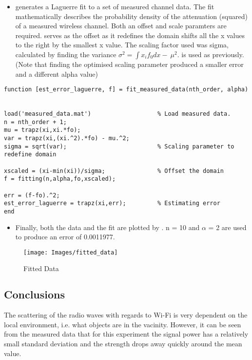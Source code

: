 \documentclass{article}
\begin{document}
 \begin{itemize}
 
 \item {} generates a Laguerre fit to a set of measured channel data.  The fit mathematically describes the probability density of the attenuation (squared) of a measured wireless channel. Both an offset and scale paramters are required.  serves as the offset as it redefines the domain shifts all the x values to the right by the smallest x value. The scaling factor used was sigma, calculated by finding the variance $\sigma^2 = \int x_i f_0  dx - \ \mu ^2$.  is used as previously. (Note that finding the optimised scaling parameter produced a smaller error and a different alpha value)
 
 \end{itemize}

 
\begin{lstlisting}
function [est_error_laguerre, f] = fit_measured_data(nth_order, alpha)

  
load('measured_data.mat')                   % Load measured data.
n = nth_order + 1;
mu = trapz(xi,xi.*fo);  
var = trapz(xi,(xi.^2).*fo) - mu.^2;
sigma = sqrt(var);                          % Scaling parameter to redefine domain

xscaled = (xi-min(xi))/sigma;               % Offset the domain 
f = fitting(n,alpha,fo,xscaled);

err = (f-fo).^2;
est_error_laguerre = trapz(xi,err);         % Estimating error
end
\end{lstlisting}

\begin{itemize}

\item Finally, both the data and the fit are plotted by . n = 10 and $\alpha$ = 2 are used to produce an error of 0.0011977.

\end{itemize}


\begin{figure}[h]
\texttt{[image: Images/fitted\_data]}
\caption{Fitted Data}
\hfill
\end{figure}

\subsection{Conclusions}

The scattering of the radio waves with regards to Wi-Fi is very dependent on the local environment, i.e. what objects are in the vacinity. However, it can be seen from the measured data that for this experiment the signal power has a relatively small standard deviation and the strength drops away quickly around the mean value.
\end{document}
